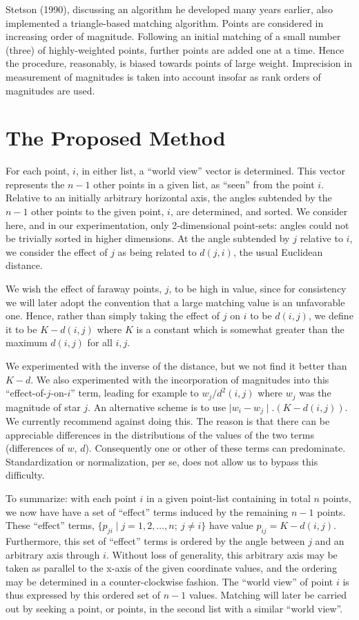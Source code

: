 Stetson (1990), discussing an algorithm he developed many years earlier,
also implemented a triangle-based matching algorithm.  Points
are considered in increasing order of magnitude.  Following an initial 
matching of a small number (three) of highly-weighted points, further points are
added one at a time.  Hence the procedure, reasonably, is biased towards  
points of large weight.  
Imprecision in measurement of magnitudes is taken into account insofar
as rank orders of magnitudes are used.

\section{The Proposed Method}

For each point, $i$,  in either list, a ``world view'' vector is determined.
This vector represents the $n-1$ other points in a given 
list, as ``seen'' from the point $i$.  Relative to an initially arbitrary
horizontal axis, the angles subtended by the $n-1$ other points to the
given point, $i$, are determined, and sorted.  We consider here, and in
our experimentation, only 2-dimensional point-sets: angles could not be
trivially sorted in higher dimensions. At the angle subtended by
$j$ relative to $i$, we consider the effect of $j$ as being related to
$d(j,i)$, the usual Euclidean distance.  

We wish the effect of faraway
points, $j$, to be high in value, since for consistency we will later adopt the
convention that a large matching value is an unfavorable one.  Hence, rather
than simply taking the effect of $j$ on $i$ to be $d(i,j)$, we define it to 
be $K - d(i,j)$ where $K$ is a constant which is somewhat greater than
the maximum $d(i,j)$ for all $i,j$.  

We experimented with the
inverse of the distance, but we not find it better than $K - d$.   
We also experimented with the incorporation of 
magnitudes into this ``effect-of-$j$-on-$i$'' term, 
leading for example to $w_j/d^2(i,j)$ where
$w_j$ was the magnitude of star $j$.  An alternative scheme is to use
$\mid w_i - w_j \mid . (K - d(i,j))$.  We  currently recommend against doing
this.  The reason is that there can be appreciable differences in the 
distributions of the values of the two terms (differences of $w$, 
$d$).  Consequently one or other
of these terms can predominate.  Standardization or normalization, per se, does
not allow us to bypass this difficulty.

To summarize: with each point $i$ in a given point-list containing in total
$n$ points, we now have have a set of ``effect'' terms induced by the 
remaining $n-1$ points.  These ``effect'' terms, $ \{ p_{ji} \mid j = 1, 2, 
\dots, n; \ 
j \neq i \}$ have value $p_{ij} = K - d(i,j)$.  Furthermore, this set of
``effect'' terms is 
ordered by the angle between  $j$ and an arbitrary axis through $i$.  Without
loss of generality, this arbitrary axis may be taken as parallel to the
x-axis of the given coordinate values, and the ordering may be determined
in a counter-clockwise fashion.  The ``world view'' of point $i$ is thus
expressed by this ordered set of $n-1$ values.  Matching will later be
carried out by seeking a point, or points, in the second list with a similar
``world view''.

